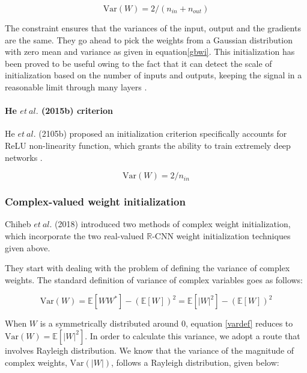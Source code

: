   \begin{equation}\label{gbwi}
\mathrm{Var}(W) = 2/(n_{in}+n_{out})
\end{equation}
 
 The constraint ensures that the variances of the input, output and the gradients are the same. They go ahead to pick the weights from a Gaussian distribution with zero mean and variance as given in equation\ref{gbwi}. This initialization has been proved to be useful owing to the fact that it can detect the scale of initialization based on the number of inputs and outputs, keeping the signal in a reasonable limit through many layers \cite{recent_advances} \cite{glorot2010understanding}.
 
 
 \paragraph{He $et \ al.$ (2015b) criterion}
 He $et \ al.$ (2105b) proposed an initialization criterion specifically accounts for ReLU non-linearity function, which grants the ability to train extremely deep networks \cite{recent_advances} \cite{he2015delving}. 
 
 
 
 \begin{equation}\label{hewi}
 \mathrm{Var}(W) = 2/n_{in}
 \end{equation}
 \subsubsection{Complex-valued weight initialization}\label{cwi}
 Chiheb $et \ al.$ (2018) introduced two methods of complex weight initialization, which incorporate the two real-valued $\mathbb{R}$-CNN weight initialization techniques given above.
 
 They start with dealing with the problem of defining the variance of complex weights. The standard definition of variance of complex variables goes as follows:
 
 \begin{equation}\label{vardef}
 \mathrm{Var}(W) = \mathbb{E}[WW^{*}]-(\mathbb{E}[W])^2 = \mathbb{E}[|W|^{2}]-(\mathbb{E}[W])^2
 \end{equation}
 
 
 When $W$ is a symmetrically distributed around 0, equation \ref{vardef} reduces to $\mathrm{Var}(W) = \mathbb{E}[|W|^{2}]$. In order to calculate this variance, we adopt a route that involves Rayleigh distribution. We know that the variance of the magnitude of complex weights, $\mathrm{Var}(|W|)$, follows a Rayleigh distribution, given below:
 
